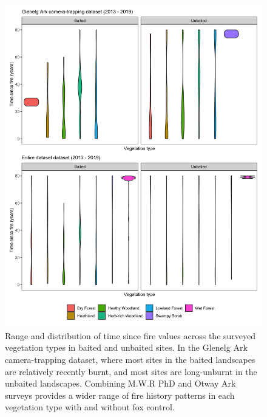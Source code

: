 \documentclass[11pt,a4paper,titlepage,twoside,openright]{style/unimelbthesis}
\begin{document}
\begin{mainmatter}
\begin{figure}
{\centering \includegraphics[width=1\linewidth]{figure/raw_data_tsf_veg} 

}

\caption{Range and distribution of time since fire values across the surveyed vegetation types in baited and unbaited sites. In the Glenelg Ark camera-trapping dataset, where most sites in the baited landscapes are relatively recently burnt, and most sites are long-unburnt in the unbaited landscapes. Combining M.W.R PhD and Otway Ark surveys provides a wider range of fire history patterns in each vegetation type with and without fox control.}\label{fig:veg-tsf-violin}
\end{figure}
\newpage
\begin{figure}


\end{figure}
\end{mainmatter}
\end{document}
